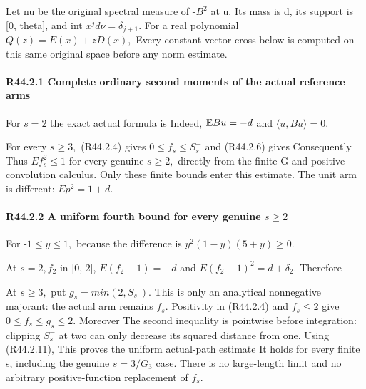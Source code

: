 Let nu be the original spectral measure of -\(B^2\) at u. Its mass is d,
its support is [0, theta], and int \(x^j d\nu= \delta_{j+1}\). For a real
polynomial \(Q(z)=E(x)+zD(x),\allowbreak \)
Every constant-vector cross below is computed on this same original
space before any norm estimate.

\paragraph{R44.2.1 Complete ordinary second moments of the actual reference arms}

For \(s=2\) the exact actual formula is
Indeed, \(\mathbb E Bu=-d\) and \(\langle u,Bu\rangle=0\).

For every \(s\ge 3,\allowbreak \) (R44.2.4) gives \(0\le f_s\le S_s^-\) and (R44.2.6) gives
Consequently
Thus \(Ef_s^2\le 1\) for every genuine \(s\ge 2,\allowbreak \) directly from the
finite G and positive-convolution calculus. Only these finite bounds
enter this estimate.
The unit arm is different: \(Ep^2=1+d.\)

\paragraph{R44.2.2 A uniform fourth bound for every genuine \(s\ge 2\)}\label{part:R44.2.2}

For -\(1\le y\le 1,\allowbreak \)
because the difference is \(y^2(1-y)(5+y)\ge 0.\)

At \(s=2,\allowbreak  f_2\) in [0, 2], \(E(f_2-1)=-d\) and
\(E(f_2-1)^2=d+\delta_2.\) Therefore

At \(s\ge 3,\allowbreak \) put \(g_s=min(2,\allowbreak  S_s^-).\) This is only an analytical
nonnegative majorant: the actual arm remains \(f_s.\) Positivity in (R44.2.4)
and \(f_s\le 2\) give \(0\le f_s\le g_s\le 2.\) Moreover
The second inequality is pointwise before integration: clipping \(S_s^-\)
at two can only decrease its squared distance from one. Using (R44.2.11),
This proves the uniform actual-path estimate
It holds for every finite s, including the genuine \(s=3/G_3\) case.
There is no large-length limit and no arbitrary positive-function
replacement of \(f_s.\)

